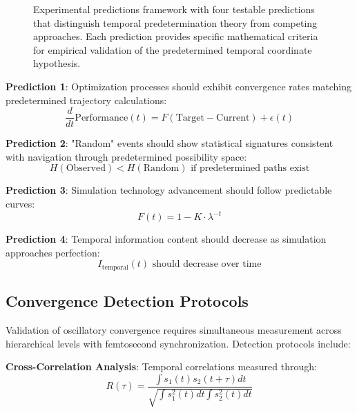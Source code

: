 \documentclass[12pt,a4paper]{article}
\begin{document}
{\begin{figure}[h]
\caption{Experimental predictions framework with four testable predictions that distinguish temporal predetermination theory from competing approaches. Each prediction provides specific mathematical criteria for empirical validation of the predetermined temporal coordinate hypothesis.}
\label{fig:experimental_predictions}
\end{figure}

\textbf{Prediction 1}: Optimization processes should exhibit convergence rates matching predetermined trajectory calculations:
$$\frac{d}{dt}\text{Performance}(t) = F(\text{Target} - \text{Current}) + \epsilon(t)$$

\textbf{Prediction 2}: "Random" events should show statistical signatures consistent with navigation through predetermined possibility space:
$$H(\text{Observed}) < H(\text{Random}) \text{ if predetermined paths exist}$$

\textbf{Prediction 3}: Simulation technology advancement should follow predictable curves:
$$F(t) = 1 - K \cdot \lambda^{-t}$$

\textbf{Prediction 4}: Temporal information content should decrease as simulation approaches perfection:
$$I_{\text{temporal}}(t) \text{ should decrease over time}$$

\subsection{Convergence Detection Protocols}

Validation of oscillatory convergence requires simultaneous measurement across hierarchical levels with femtosecond synchronization. Detection protocols include:

\textbf{Cross-Correlation Analysis}: Temporal correlations measured through:
$$R(\tau) = \frac{\int s_1(t)s_2(t+\tau) dt}{\sqrt{\int s_1^2(t) dt \int s_2^2(t) dt}}$$

}
\end{document}
